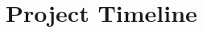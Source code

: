 \documentclass[../mthe-493-project-proposal]{subfiles}
\begin{document}
    \chapter{Project Timeline}
    \label{ch:project-timeline}
\end{document}
